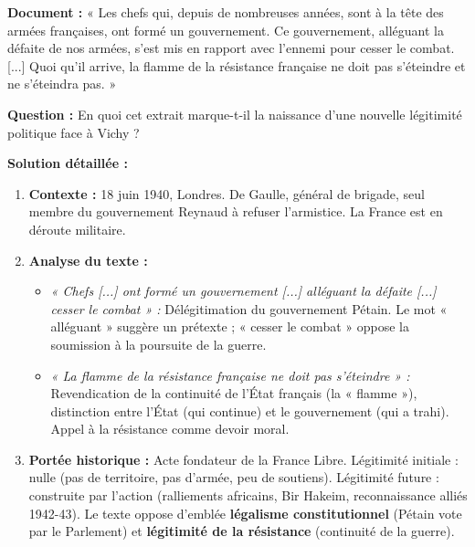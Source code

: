 \documentclass[11pt]{article}
\begin{document}
\begin{exoresolu}
\textbf{Document :} « Les chefs qui, depuis de nombreuses années, sont à la tête des armées françaises, ont formé un gouvernement. Ce gouvernement, alléguant la défaite de nos armées, s'est mis en rapport avec l'ennemi pour cesser le combat. [...] Quoi qu'il arrive, la flamme de la résistance française ne doit pas s'éteindre et ne s'éteindra pas. »

\textbf{Question :} En quoi cet extrait marque-t-il la naissance d'une nouvelle légitimité politique face à Vichy ?

\textbf{Solution détaillée :}
\begin{enumerate}
\item \textbf{Contexte :} 18 juin 1940, Londres. De Gaulle, général de brigade, seul membre du gouvernement Reynaud à refuser l'armistice. La France est en déroute militaire.
\item \textbf{Analyse du texte :}
\begin{itemize}
\item \emph{« Chefs [...] ont formé un gouvernement [...] alléguant la défaite [...] cesser le combat » :} Délégitimation du gouvernement Pétain. Le mot « alléguant » suggère un prétexte ; « cesser le combat » oppose la soumission à la poursuite de la guerre.
\item \emph{« La flamme de la résistance française ne doit pas s'éteindre » :} Revendication de la continuité de l'État français (la « flamme »), distinction entre l'État (qui continue) et le gouvernement (qui a trahi). Appel à la résistance comme devoir moral.
\end{itemize}
\item \textbf{Portée historique :} Acte fondateur de la France Libre. Légitimité initiale : nulle (pas de territoire, pas d'armée, peu de soutiens). Légitimité future : construite par l'action (ralliements africains, Bir Hakeim, reconnaissance alliés 1942-43). Le texte oppose d'emblée \textbf{légalisme constitutionnel} (Pétain vote par le Parlement) et \textbf{légitimité de la résistance} (continuité de la guerre).
\end{enumerate}
\end{exoresolu}
\end{document}
